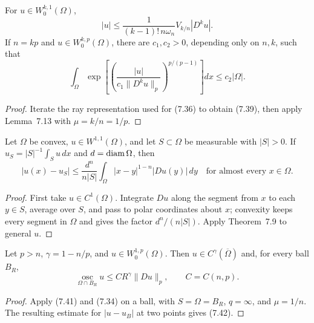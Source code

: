 \begin{corollary}
\label{gt:cor-sobolev-moser-trudinger-higher-order}
For $u\in W_0^{k,1}(\Omega)$,
\begin{equation}
\tag{7.39}
|u|\leq\frac1{(k-1)!\,n\omega_n}V_{k/n}|D^ku|.
\end{equation}
If $n=kp$ and $u\in W_0^{k,p}(\Omega)$, there are $c_1,c_2>0$, depending
only on $n,k$, such that
\begin{equation}
\tag{7.40}
\int_\Omega
\exp\!\left[\left(\frac{|u|}{c_1\|D^ku\|_p}\right)^{p/(p-1)}\right]dx
\leq c_2|\Omega|.
\end{equation}
\end{corollary}
\begin{proof}
\sketch Iterate the ray representation used for (7.36) to obtain (7.39),
then apply Lemma~7.13 with $\mu=k/n=1/p$.
\end{proof}

\begin{lemma}
\label{gt:lem-sobolev-convex-average-estimate}
Let $\Omega$ be convex, $u\in W^{1,1}(\Omega)$, and let
$S\subset\Omega$ be measurable with $|S|>0$. If
$u_S=|S|^{-1}\int_Su\,dx$ and $d=\operatorname{diam}\Omega$, then
\begin{equation}
\tag{7.41}
|u(x)-u_S|\leq\frac{d^n}{n|S|}
\int_\Omega |x-y|^{1-n}|Du(y)|\,dy
\quad\text{for almost every }x\in\Omega.
\end{equation}
\end{lemma}
\begin{proof}
\sketch First take $u\in C^1(\Omega)$. Integrate $Du$ along the segment from
$x$ to each $y\in S$, average over $S$, and pass to polar coordinates about
$x$; convexity keeps every segment in $\Omega$ and gives the factor
$d^n/(n|S|)$. Apply Theorem~7.9 to general $u$.
\end{proof}

\begin{theorem}
\label{gt:thm-sobolev-morrey}
Let $p>n$, $\gamma=1-n/p$, and $u\in W_0^{1,p}(\Omega)$. Then
$u\in C^\gamma(\overline\Omega)$ and, for every ball $B_R$,
\begin{equation}
\tag{7.42}
\operatorname*{osc}_{\Omega\cap B_R}u
\leq C R^\gamma\|Du\|_p,
\qquad C=C(n,p).
\end{equation}
\end{theorem}
\begin{proof}
\sketch Apply (7.41) and (7.34) on a ball, with
$S=\Omega=B_R$, $q=\infty$, and $\mu=1/n$. The resulting estimate for
$|u-u_B|$ at two points gives (7.42).
\end{proof}

